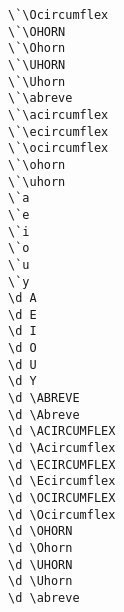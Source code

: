 \begin{multicols}{2}
\X{\`\Ocircumflex} \verb|\`\Ocircumflex| \\
\X{\`\OHORN} \verb|\`\OHORN| \\
\X{\`\Ohorn} \verb|\`\Ohorn| \\
\X{\`\UHORN} \verb|\`\UHORN| \\
\X{\`\Uhorn} \verb|\`\Uhorn| \\
\X{\`\abreve} \verb|\`\abreve| \\
\X{\`\acircumflex} \verb|\`\acircumflex| \\
\X{\`\ecircumflex} \verb|\`\ecircumflex| \\
\X{\`\ocircumflex} \verb|\`\ocircumflex| \\
\X{\`\ohorn} \verb|\`\ohorn| \\
\X{\`\uhorn} \verb|\`\uhorn| \\
 \verb|\`a| \\
 \verb|\`e| \\
 \verb|\`i| \\
 \verb|\`o| \\
 \verb|\`u| \\
 \verb|\`y| \\
 \verb|\d A| \\
 \verb|\d E| \\
 \verb|\d I| \\
 \verb|\d O| \\
 \verb|\d U| \\
 \verb|\d Y| \\
\X{\d \ABREVE} \verb|\d \ABREVE| \\
\X{\d \Abreve} \verb|\d \Abreve| \\
\X{\d \ACIRCUMFLEX} \verb|\d \ACIRCUMFLEX| \\
\X{\d \Acircumflex} \verb|\d \Acircumflex| \\
\X{\d \ECIRCUMFLEX} \verb|\d \ECIRCUMFLEX| \\
\X{\d \Ecircumflex} \verb|\d \Ecircumflex| \\
\X{\d \OCIRCUMFLEX} \verb|\d \OCIRCUMFLEX| \\
\X{\d \Ocircumflex} \verb|\d \Ocircumflex| \\
\X{\d \OHORN} \verb|\d \OHORN| \\
\X{\d \Ohorn} \verb|\d \Ohorn| \\
\X{\d \UHORN} \verb|\d \UHORN| \\
\X{\d \Uhorn} \verb|\d \Uhorn| \\
\X{\d \abreve} \verb|\d \abreve| \\

\end{multicols}

